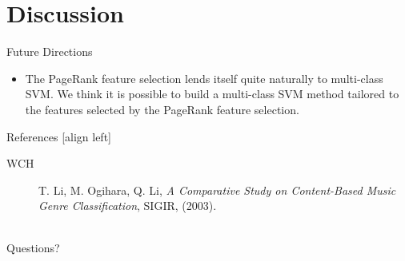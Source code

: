 \documentclass[xcolor=dvipsnames,t]{beamer} %
\begin{document}
\section{Discussion}
\begin{frame}{Future Directions}
   \begin{itemize}
      \item The PageRank feature selection lends itself quite naturally to multi-class SVM.  We think it is possible to build a multi-class SVM method tailored to the features selected by the PageRank feature selection.
   \end{itemize}

\end{frame}

\begin{frame}{References}
   [align left] %
   \begin{description}                              %
      \item[WCH] T. Li, M. Ogihara, Q. Li, \emph{A Comparative Study on Content-Based Music Genre Classification}, SIGIR, (2003).\\
   \end{description}
   ~\\
   Questions?

\end{frame}
\end{document}
